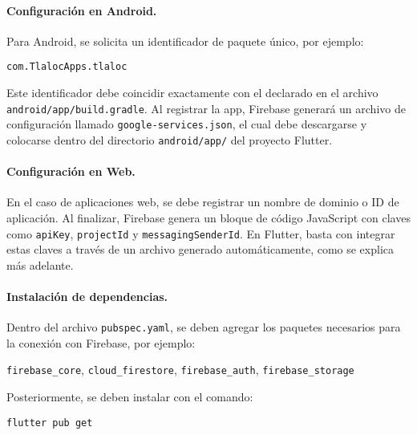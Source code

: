 \paragraph{Configuración en Android.}  
Para Android, se solicita un identificador de paquete único, por ejemplo:

\begin{center}
  \texttt{com.TlalocApps.tlaloc}
\end{center}

Este identificador debe coincidir exactamente con el declarado en el archivo \texttt{android/app/build.gradle}. Al registrar la app, Firebase generará un archivo de configuración llamado \texttt{google-services.json}, el cual debe descargarse y colocarse dentro del directorio \texttt{android/app/} del proyecto Flutter.

\vspace{1em}

\paragraph{Configuración en Web.}  
En el caso de aplicaciones web, se debe registrar un nombre de dominio o ID de aplicación. Al finalizar, Firebase genera un bloque de código JavaScript con claves como \texttt{apiKey}, \texttt{projectId} y \texttt{messagingSenderId}. En Flutter, basta con integrar estas claves a través de un archivo generado automáticamente, como se explica más adelante.

\vspace{1em}

\paragraph{Instalación de dependencias.}  
Dentro del archivo \texttt{pubspec.yaml}, se deben agregar los paquetes necesarios para la conexión con Firebase, por ejemplo:

\begin{center}
  \texttt{firebase\_core}, \quad
  \texttt{cloud\_firestore}, \quad
  \texttt{firebase\_auth}, \quad
  \texttt{firebase\_storage}
\end{center}

Posteriormente, se deben instalar con el comando:

\begin{center}
  \texttt{flutter pub get}
\end{center}

\vspace{1em}

